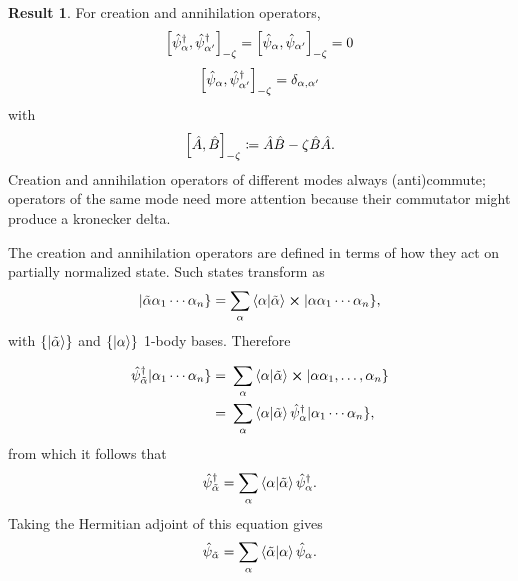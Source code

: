 \documentclass{article}
\theoremstyle{definition}
\newtheorem{res}{Result}[section]
\theoremstyle{plain}
\numberwithin{equation}{section}
\begin{document}
\begin{graybox}
\begin{res}
    \label{res:commutators-of-creation-and-annihilation-operators}
    For creation and annihilation operators, 
    \begin{equation}
        \comm{\hat{\psi}^{\dagger}_{\alpha}}{\hat{\psi}^{\dagger}_{\alpha'}}
        _{-\zeta}
        =
        \comm{\hat{\psi}_{\alpha}}{\hat{\psi}_{\alpha'}}
        _{-\zeta}
        =0
    \end{equation}
    \begin{equation}
        \comm{\hat{\psi}_{\alpha}}{\hat{\psi}^{\dagger}_{\alpha'}}
        _{-\zeta}
        =
        \delta_{\alpha,\alpha'}
    \end{equation}
    with 
    \begin{equation}
    \comm{\hat{A}}{\hat{B}}_{-\zeta}
    \coloneqq
    \hat{A}\hat{B}-\zeta \hat{B} \hat{A}.
    \end{equation}
    Creation and annihilation operators 
    of different modes always (anti)commute; 
    operators of the same mode 
    need more attention because their commutator 
    might produce a kronecker delta.
\end{res}
\end{graybox}

The creation and annihilation operators 
are defined 
in terms of how they act on partially normalized state. 
Such states transform as 
\[
    |\tilde{\alpha} \alpha_1 \cdots \alpha_{n}\}
    =
    \sum_{\alpha}
    \bra{\alpha}\ket{\tilde{\alpha}}
    \cross 
    |\alpha \alpha_{1}\cdots \alpha_{n}\},
\]
with $\{\ket{\tilde{\alpha}}\}$ and $\{\ket{\alpha}\}$
1-body bases. Therefore

\begin{align*}
    \hat{\psi}^{\dagger}_{\tilde{\alpha}}
    |\alpha_1\cdots \alpha_{n}\}
    =&\ 
    \sum_{\alpha}\bra{\alpha}\ket{\tilde{\alpha}}
    \cross 
    |\alpha \alpha_1, \ldots ,\alpha_{n}\} \\
    =&\ 
    \sum_{\alpha}\bra{\alpha}\ket{\tilde{\alpha}}
    \hat{\psi}^{\dagger}_{\alpha}
    |\alpha_1\cdots \alpha_{n}\},
\end{align*}
from which it follows that 
\[
    \hat{\psi}^{\dagger}_{\tilde{\alpha}}
    =
    \sum_{\alpha}\bra{\alpha}\ket{\tilde{\alpha}}
    \hat{\psi}^{\dagger}_{\alpha}.
\]
Taking the Hermitian adjoint of this equation gives 
\[
    \hat{\psi}_{\tilde{\alpha}}
    =
    \sum_{\alpha}
    \bra{\tilde{\alpha}}\ket{\alpha}
    \hat{\psi}_{\alpha}.
\]
\end{document}
